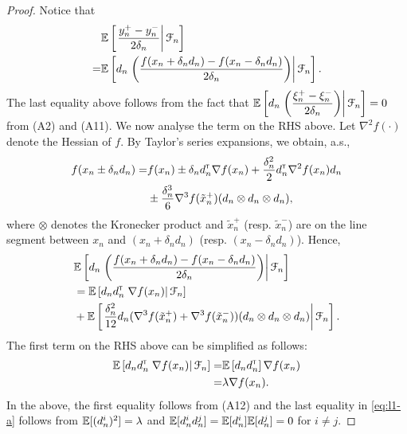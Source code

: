 \begin{proof}
Notice that
\begin{align*}
&\mathbb{E}\left[\left.\dfrac{y_n^+ - y_n^-}{2\delta_n} \right| \mathcal{F}_n\right] \\
= & \mathbb{E}\left[d_n\left.\left(\dfrac{f(x_n+\delta_n d_n) - f(x_n-\delta_n d_n)}{2\delta_n}\right) \right| \mathcal{F}_n\right].
\end{align*}
The last equality above follows from the fact that $\mathbb{E}\left[  d_n\left.\left(\dfrac{\xi_n^+ - \xi_n^-}{2\delta_n}\right) \right| \mathcal{F}_n\right]=0$ from (A2) and (A11). We now analyse the term on the RHS above.
Let $\nabla^2 f(\cdot)$ denote the Hessian of $f$.
By Taylor's series expansions, we obtain, a.s.,
\begin{align*}
f(x_n \pm \delta_n d_n) =& f(x_n) \pm \delta_n d_n^\mathsf{\scriptscriptstyle T} \nabla f(x_n) + \frac{\delta_n^2}{2} d_n^\mathsf{\scriptscriptstyle T} \nabla^2 f(x_n) d_n \\
& \pm  \frac{\delta_n^3}{6} \nabla^3 f(\tilde  x_n^+)(d_n \otimes d_n \otimes d_n),
\end{align*}
where $\otimes$ denotes the Kronecker product and $\tilde x_n^+$ (resp. $\tilde x_n^-$) are on the line segment between $x_n$ and $(x_n + \delta_n d_n)$ (resp. $(x_n - \delta_n d_n)$).
Hence,
\begin{align}
&\mathbb{E}\left[d_n\left.\left(\dfrac{f(x_n+\delta_n d_n) - f(x_n-\delta_n d_n)}{2\delta_n}\right)\right| \mathcal{F}_n \right] \nonumber\\
&= \mathbb{E}\left[d_n d_n^\mathsf{\scriptscriptstyle T} \left.\nabla f(x_n)\right| \mathcal{F}_n\right]\nonumber \\
& +   \mathbb{E}\left[\left.\frac{\delta_n^2}{12} d_n (\nabla^3 f(\tilde  x_n^+)+\nabla^3 f(\tilde  x_n^-))(d_n \otimes d_n \otimes d_n)\right| \mathcal{F}_n\right]. \label{eq:l1}
\end{align}
The first term on the RHS above can be simplified as follows:
\begin{align}
\mathbb{E}\left[d_n d_n^\mathsf{\scriptscriptstyle T} \left.\nabla f(x_n)\right| \mathcal{F}_n\right] = &\mathbb{E}\left[d_n d_n^\mathsf{\scriptscriptstyle T} \right] \nabla f(x_n) \nonumber\\
= &  \lambda \nabla f(x_n). \label{eq:l1-a}
\end{align}
In the above, the first equality follows from (A12) and the last equality in \eqref{eq:l1-a} follows from $\mathbb{E}[(d_n^i)^2] = \lambda$ and $\mathbb{E}[d_n^i d_n^j] = \mathbb{E}[d_n^i] \mathbb{E}[d_n^j] = 0$ for $i\ne j$.


\end{proof}
